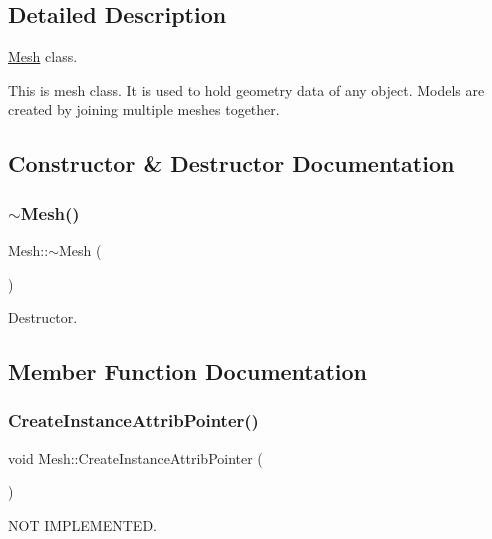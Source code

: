 \subsection{Detailed Description}
\mbox{\hyperlink{class_mesh}{Mesh}} class. 

This is mesh class. It is used to hold geometry data of any object. Models are created by joining multiple meshes together. 

\subsection{Constructor \& Destructor Documentation}
\mbox{\label{class_mesh_a5efe4da1a4c0971cfb037bd70304c303}} 
\subsubsection{\texorpdfstring{$\sim$Mesh()}{~Mesh()}}
{\footnotesize\ttfamily Mesh\+::$\sim$\+Mesh (\begin{DoxyParamCaption}{ }\end{DoxyParamCaption})}



Destructor. 



\subsection{Member Function Documentation}
\mbox{\label{class_mesh_a916735fb6745a444abc21011e11ed3e4}} 
\subsubsection{\texorpdfstring{CreateInstanceAttribPointer()}{CreateInstanceAttribPointer()}}
{\footnotesize\ttfamily void Mesh\+::\+Create\+Instance\+Attrib\+Pointer (\begin{DoxyParamCaption}{ }\end{DoxyParamCaption})}



N\+OT I\+M\+P\+L\+E\+M\+E\+N\+T\+ED. 

\mbox{\label{class_mesh_ab4d75bfd6e4603aa774eba1cfb83bffe}} 

